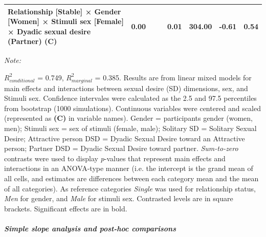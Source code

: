 \documentclass[
  bookmarksnumbered]{article}
\begin{document}
\begin{table}[H]
{\begin{threeparttable}
\begin{tabular}[t]{lccccccc}
Relationship [Stable] × Gender [Women] × Stimuli sex [Female] × Dyadic sexual desire (Partner) (C) & 0.00 &  &  & 0.01 & 304.00 & -0.61 & 0.54\\
\bottomrule
\end{tabular}
\begin{tablenotes}[para]
\item \textit{Note: } 
\item $R^2_{conditional}$ = 0.749, $R^2_{marginal}$ = 0.385. Results are from linear mixed models for main 
                              effects and interactions between sexual desire (SD) dimensions,
                              sex, and Stimuli sex.
                              Confidence intervales were calculated as the 2.5 and 97.5 
                              percentiles from bootstrap (1000 simulations).
                              Continuous variables were centered and scaled
                              (represented as \textbf{(C)} in variable names).
                              Gender = participants gender (women, men); 
                              Stimuli sex = sex of stimuli (female, male); 
                              Solitary SD = Solitary Sexual Desire;
                              Attractive person DSD = Dyadic Sexual Desire toward an 
                              Attractive person;
                              Partner DSD = Dyadic Sexual Desire toward partner.
                              \textit{Sum-to-zero} contrasts were used to display
                              \textit{p}-values that represent main effects and interactions 
                              in an ANOVA-type manner (i.e. the intercept is the grand mean of 
                              all cells, and estimates are differences between each category
                              mean and the mean of all categories).
                              As reference categories 
                              \textit{Single} was used for relationship status,
                              \textit{Men} for gender,
                              and \textit{Male} for stimuli sex. 
                              Contrasted levels are in square brackets. 
                              Significant effects are in bold.
\end{tablenotes}
\end{threeparttable}}
\end{table}

\hypertarget{simple-slope-analysis-and-post-hoc-comparisons}{%
\subparagraph{\texorpdfstring{Simple slope analysis and \emph{post-hoc} comparisons}{Simple slope analysis and post-hoc comparisons}}\label{simple-slope-analysis-and-post-hoc-comparisons}}
\end{document}
